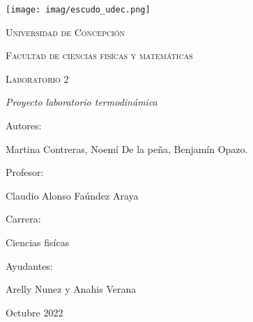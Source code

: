 \documentclass[a4paper, 12p]{article}
\begin{document}
\begin{titlepage}
      \begin{center}     
              
            \texttt{[image: imag/escudo\_udec.png]}                       %
            
            
            
            \vspace{1cm}
            \textsc{{\LARGE Universidad de Concepción}}
            
            \vspace{1cm}
            {\scshape\Large Facultad de ciencias fisícas y matemáticas \par}
            \vspace{2cm}
            {\scshape\Huge Laboratorio 2 \par}
            \vspace{2cm}
            {\itshape\Large Proyecto laboratorio termodinámica \par}
            \vfill
            {\Large Autores: \par}
            {\Large Martina Contreras, Noemí De la peña, Benjamín Opazo. \par}
            \vfill
            \vfill
            {\Large Profesor: \par}
            {\Large Claudio Alonso Faúndez Araya \par}
            \vfill
            \vfill
            {\Large Carrera: \par}
            {\Large Ciencias fisícas \par}
            \vfill
            \vfill
            {\Large Ayudantes: \par}
            {\Large Arelly Nunez y Anahis Verana \par}
            \vfill
            {\Large Octubre 2022 \par}
      \end{center}
\end{titlepage}            

\tableofcontents
\newpage

\end{document}
